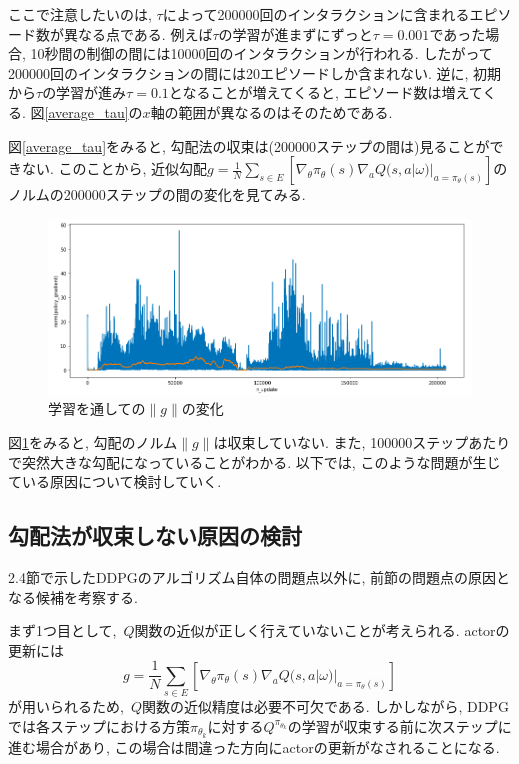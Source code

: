 \documentclass{jsarticle}
\begin{document}
ここで注意したいのは, $\tau$によって200000回のインタラクションに含まれるエピソード数が異なる点である. 例えば$\tau$の学習が進まずにずっと$\tau=0.001$であった場合, 10秒間の制御の間には10000回のインタラクションが行われる. したがって200000回のインタラクションの間には20エピソードしか含まれない. 逆に, 初期から$\tau$の学習が進み$\tau=0.1$となることが増えてくると, エピソード数は増えてくる. 図\ref{average_tau}の$x$軸の範囲が異なるのはそのためである. \par
図\ref{average_tau}をみると, 勾配法の収束は(200000ステップの間は)見ることができない. このことから, 近似勾配$g=\frac{1}{N}\sum_{s\in E}[\nabla_{\theta}\pi_{\theta}(s)\nabla_{a}Q(s, a|\omega)|_{a=\pi_{\theta}(s)}]$のノルムの200000ステップの間の変化を見てみる. 
\begin{figure}[h]
	\centering
 	\includegraphics[width=14cm]{gradient_log.png}
 	\caption{学習を通しての$\|g\|$の変化} \label{gradient_log}
\end{figure}\par
図\ref{gradient_log}をみると, 勾配のノルム$\|g\|$は収束していない. また, 100000ステップあたりで突然大きな勾配になっていることがわかる. 以下では, このような問題が生じている原因について検討していく.

\subsection{勾配法が収束しない原因の検討}
2.4節で示したDDPGのアルゴリズム自体の問題点以外に, 前節の問題点の原因となる候補を考察する. \par
まず1つ目として,~$Q$関数の近似が正しく行えていないことが考えられる. actorの更新には
\begin{equation*}
	g=\frac{1}{N}\sum_{s\in E}[\nabla_{\theta}\pi_{\theta}(s)\nabla_{a}Q(s, a|\omega)|_{a=\pi_{\theta}(s)}]
\end{equation*}
が用いられるため,~$Q$関数の近似精度は必要不可欠である. しかしながら, DDPGでは各ステップにおける方策$\pi_{\theta_k}$に対する$Q^{\pi_{\theta_k}}$の学習が収束する前に次ステップに進む場合があり, この場合は間違った方向にactorの更新がなされることになる.\par
\end{document}
